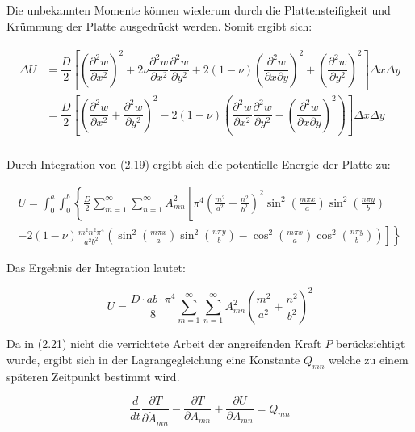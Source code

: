 Die unbekannten Momente können wiederum durch die Plattensteifigkeit und Krümmung der Platte ausgedrückt werden. Somit ergibt sich:

\begin{align}
\begin{split}
\Delta U 	&=  \dfrac{D}{2}\left[
\left(\dfrac{\partial^2 w}{\partial x^2}\right)^2
+ 2 \nu \dfrac{\partial^2 w}{\partial x^2} \dfrac{\partial^2 w}{\partial y^2}
+ 2(1-\nu) \left(\dfrac{\partial^2 w}{\partial x \partial y}\right)^2
+ \left(\dfrac{\partial^2 w}{\partial y^2}\right)^2 \right] \Delta x \Delta y\\
&=  \dfrac{D}{2}\left[
\left(
\dfrac{\partial^2 w}{\partial x^2} + \dfrac{\partial^2 w}{\partial y^2}\right)^2 
- 2 (1-\nu) \left( \dfrac{\partial^2 w}{\partial x^2} \dfrac{\partial^2 w}{\partial y^2} - \left( \dfrac{\partial^2 w}{\partial x \partial y} \right)^2\right) \right] \Delta x \Delta y\\
\end{split}
\end{align}


Durch Integration von (2.19) ergibt sich die potentielle Energie der Platte zu:


\begin{multline}
U = \int_0^a \int_0^b \left\{
\frac{D}{2} \sum_{m = 1}^{\infty}\sum_{n = 1}^{\infty} A^2_{mn}
\left[
\pi^4 \left(\frac{m^2}{a^2} + \frac{n^2}{b^2}\right)^2
\sin^2\left(\frac{m\pi x}{a}\right) \sin^2\left(\frac{n\pi y}{b}\right)
\right.
\right. \\
\left.
\left.
-2(1-\nu) 
\frac{m^2n^2\pi^4}{a^2b^2}
\left(
\sin^2\left(\frac{m\pi x}{a}\right) 
\sin^2\left(\frac{n\pi y}{b}\right)
- 
\cos^2\left(\frac{m\pi x}{a}\right) 
\cos^2\left(\frac{n\pi y}{b}\right)
\right)
\right] 
\right\}
\end{multline}

Das Ergebnis der Integration lautet:

\begin{equation}
U = \dfrac{D \cdot a b \cdot \pi^4}{8} \sum_{m=1}^{\infty}  \sum_{n=1}^{\infty} A^2_{mn}  \left( \dfrac{m^2}{a^2} + \dfrac{n^2}{b^2}\right)^2
\end{equation}


Da in (2.21) nicht die verrichtete Arbeit der angreifenden Kraft $P$ berücksichtigt wurde, ergibt sich in der Lagrangegleichung eine Konstante $Q_{mn}$ welche zu einem späteren Zeitpunkt bestimmt wird.

\begin{equation}
\dfrac{d}{dt} \dfrac{\partial T}{\partial \dot{A}_{mn}} - \dfrac{\partial T}{\partial A_{mn}} + \dfrac{\partial U}{\partial A_{mn}} = Q_{mn}
\end{equation}

